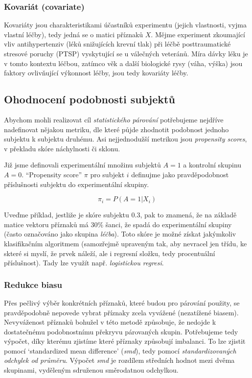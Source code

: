 \subsubsection{Kovariát (covariate)}

Kovariáty jsou charakteristikami účastníků experimentu (jejich vlastnosti, vyjma vlastní léčby), tedy jedná se o matici příznaků \( X \).
Mějme experiment zkoumající vliv antihypertenziv (léků snižujících krevní tlak) při léčbě posttraumatické stresové poruchy (PTSP) vyskytující se u válečných veteránů.
Míra dávky léku je v tomto kontextu léčbou, zatímco věk a další biologické rysy (váha, výška) jsou faktory ovlivňující výkonnost léčby, jsou tedy kovariáty léčby.

\subsection{Ohodnocení podobnosti subjektů}

Abychom mohli realizovat cíl \textit{statistického párování} potřebujeme nejdříve nadefinovat nějakou metriku, dle které půjde zhodnotit podobnost jednoho subjektu k subjektu druhému.
Asi nejjednodužší metrikou jsou \textit{propensity scores}, v překladu skóre náchylnosti či sklonu.

Již jsme definovali experimentální množinu subjektů \( A = 1 \) a kontrolní skupinu \( A = 0 \).
\enquote{Propensity score} \( \pi \) pro subjekt \( i \) definujme jako pravděpodobnost příslušnosti subjektu do experimentální skupiny.

\[ \pi_i = P(A = 1 | X_i) \]

Uveďme příklad, jestliže je skóre subjektu \( 0.3 \), pak to znamená, že na základě matice vektoru příznaků má \( 30\% \) šanci, že spadá do experimentální skupiny (často označováno jako skupina \textit{léčba}).
Toto skóre je možné získat jakýmkoliv klasifikačním algoritmem (samozřejmě upraveným tak, aby nevracel jen třídu, ke skteré si myslí, že prvek náleží, ale i regresní složku, tedy procentuální příslušnost).
Tady lze využít např. \textit{logistickou regresi}.

\subsubsection{Redukce biasu}

Přes pečlivý výběr konkrétních příznaků, které budou pro párování použity, se pravděpodobně nepovede vybrat příznaky zcela vyvážené (nezatížené biasem).
Nevyváženost příznaků bohužel v této metodě způsobuje, že nedojde k dostatečnému podobnostnímu překryvu párovaných skupin.
Potřebujeme tedy výpočet, díky kterému zjistíme které příznaky způsobují imbalanci.
To lze zjistit pomocí \enquote*{standardized mean difference} (\textit{smd}), tedy pomocí \textit{standardizovaných odchylek od průměru}.
Výpočet \textit{smd} je rozdílem středních hodnot mezi dvěma skupinami, vyděleným sdruženou směrodatnou odchylkou.

